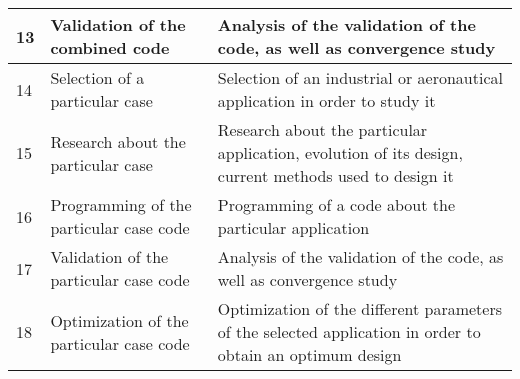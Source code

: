 \begin{tabular}{|p{1cm}|p{4cm}|p{10cm}|}
\hline 
13 & Validation of the combined code & Analysis of the validation of the code, as well as convergence study \\ 
\hline 
14 & Selection of a particular case & Selection of an industrial or aeronautical application in order to study it \\ 
\hline 
15 & Research about the particular case & Research about the particular application, evolution of its design, current methods used to design it \\ 
\hline 
16 & Programming of the particular case code & Programming of a code about the particular application \\ 
\hline 
17 & Validation of the particular case code & Analysis of the validation of the code, as well as convergence study \\ 
\hline 
18 & Optimization of the particular case code & Optimization of the different parameters of the selected application in order to obtain an optimum design \\ 
\hline 
\end{tabular}
\pagebreak

